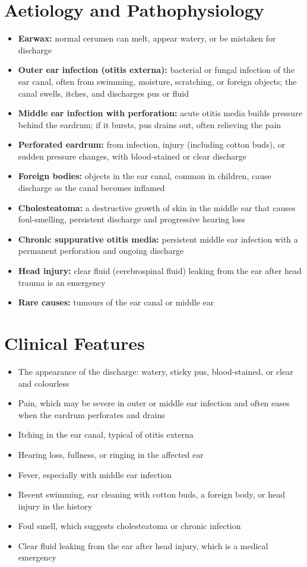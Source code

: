 \section*{Aetiology and Pathophysiology}
\begin{itemize}
    \item \textbf{Earwax:} normal cerumen can melt, appear watery, or be mistaken for discharge
    \item \textbf{Outer ear infection (otitis externa):} bacterial or fungal infection of the ear canal, often from swimming, moisture, scratching, or foreign objects; the canal swells, itches, and discharges pus or fluid
    \item \textbf{Middle ear infection with perforation:} acute otitis media builds pressure behind the eardrum; if it bursts, pus drains out, often relieving the pain
    \item \textbf{Perforated eardrum:} from infection, injury (including cotton buds), or sudden pressure changes, with blood-stained or clear discharge
    \item \textbf{Foreign bodies:} objects in the ear canal, common in children, cause discharge as the canal becomes inflamed
    \item \textbf{Cholesteatoma:} a destructive growth of skin in the middle ear that causes foul-smelling, persistent discharge and progressive hearing loss
    \item \textbf{Chronic suppurative otitis media:} persistent middle ear infection with a permanent perforation and ongoing discharge
    \item \textbf{Head injury:} clear fluid (cerebrospinal fluid) leaking from the ear after head trauma is an emergency
    \item \textbf{Rare causes:} tumours of the ear canal or middle ear
\end{itemize}

\section*{Clinical Features}
\begin{itemize}
    \item The appearance of the discharge: watery, sticky pus, blood-stained, or clear and colourless
    \item Pain, which may be severe in outer or middle ear infection and often eases when the eardrum perforates and drains
    \item Itching in the ear canal, typical of otitis externa
    \item Hearing loss, fullness, or ringing in the affected ear
    \item Fever, especially with middle ear infection
    \item Recent swimming, ear cleaning with cotton buds, a foreign body, or head injury in the history
    \item Foul smell, which suggests cholesteatoma or chronic infection
    \item Clear fluid leaking from the ear after head injury, which is a medical emergency
\end{itemize}

